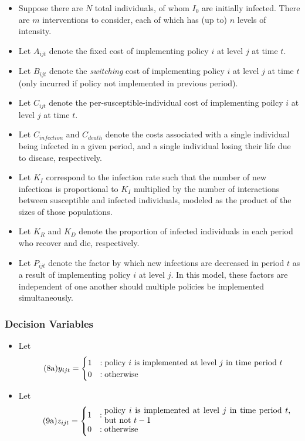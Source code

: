 \documentclass{article}
\begin{document}
\begin{itemize}
    \item Suppose there are $N$ total individuals, of whom $I_0$ are initially infected. There are $m$ interventions to consider, each of which has (up to) $n$ levels of intensity.
    \item Let $A_{ijt}$ denote the fixed cost of implementing policy $i$ at level $j$ at time $t$.
    \item Let $B_{ijt}$ denote the \emph{switching} cost of implementing policy $i$ at level $j$ at time $t$ (only incurred if policy not implemented in previous period).
    \item Let $C_{ijt}$ denote the per-susceptible-individual cost of implementing poilcy $i$ at level $j$ at time $t$.
    \item Let $C_{infection}$ and $C_{death}$ denote the costs associated with a single individual being infected in a given period, and a single individual losing their life due to disease, respectively.
    \item Let $K_I$ correspond to the infection rate such that the number of new infections is proportional to $K_I$ multiplied by the number of interactions between susceptible and infected individuals, modeled as the product of the sizes of those populations.
    \item  Let $K_R$ and $K_D$ denote the proportion of infected individuals in each period who recover and die, respectively.
    \item Let $P_{ijt}$ denote the factor by which new infections are decreased in period $t$ as a result of implementing policy $i$ at level $j$. In this model, these factors are independent of one another should multiple policies be implemented simultaneously.
\end{itemize}

\subsubsection*{Decision Variables}
\begin{itemize}
    \item Let
          \begin{equation}\label{eq:y_definition}\tag{8a}
              y_{ijt} = \begin{cases}1 &: \parbox[c]{8cm}{policy $i$ is implemented at level $j$ in time period $t$}\\ 0 &: \text{otherwise}\end{cases}
          \end{equation}
    \item Let
            \begin{equation}\label{eq:z_definition}\tag{9a}
                z_{ijt} = \begin{cases}1 &: \parbox[c]{8cm}{policy $i$ is implemented at level $j$ in time period $t$, but not $t-1$}\\ 0 &: \text{otherwise}\end{cases}
            \end{equation}
\end{itemize}
\end{document}
